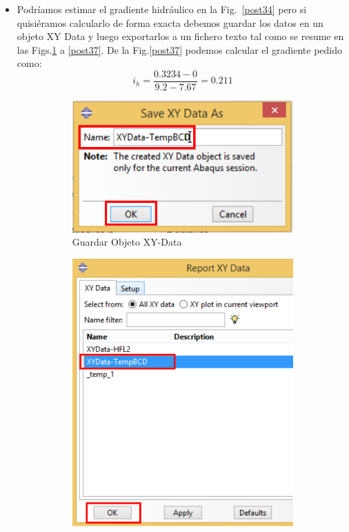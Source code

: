 \begin{itemize}
\item Podríamos estimar el gradiente hidráulico en la
  Fig.~\ref{post34} pero si quisiéramos calcularlo de forma exacta
  debemos guardar los datos en un objeto XY Data y luego exportarlos a
  un fichero texto tal como se resume en las Figs.\ref{post35} a
  \ref{post37}. De la Fig.\ref{post37} podemos calcular el gradiente
  pedido como:
  \begin{equation}
    \label{eq:02}
    i_h=\frac{0.3234-0}{9.2-7.67}=0.211
  \end{equation}

   \begin{figure}[!h]
     \centering
     \begin{subfigure}[!h]{0.33\textwidth}
       \includegraphics[width=\textwidth]{./body/images/post35.pdf}
       \caption{Guardar Objeto XY-Data}
       \label{post35}
     \end{subfigure}%
     \begin{subfigure}[!h]{0.33\textwidth}
       \includegraphics[width=\textwidth]{./body/images/post36.pdf}

\end{subfigure}
\end{figure}
\end{itemize}
